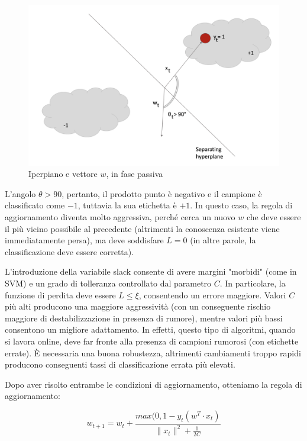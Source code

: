 \begin{figure}[h]
    \centering
    \includegraphics[scale=0.5]{Figure/PAII1.png}
    \caption{Iperpiano e vettore $w$, in fase passiva}
    \label{fig:PAII1}
\end{figure}
\FloatBarrier  

L'angolo $\theta> 90$, pertanto, il prodotto punto è negativo e il campione è classificato come $-1$, tuttavia la sua etichetta è $+1$. In questo caso, la regola di aggiornamento diventa molto aggressiva, perché cerca un nuovo $w$ che deve essere il più vicino possibile al precedente (altrimenti la conoscenza esistente viene immediatamente persa), ma deve soddisfare $L = 0$ (in altre parole, la classificazione deve essere corretta).

L'introduzione della variabile slack consente di avere margini "morbidi" (come in SVM) e un grado di tolleranza controllato dal parametro $C$. In particolare, la funzione di perdita deve essere $L \leq \xi$, consentendo un errore maggiore. Valori $C$ più alti producono una maggiore aggressività (con un conseguente rischio maggiore di destabilizzazione in presenza di rumore), mentre valori più bassi consentono un migliore adattamento. In effetti, questo tipo di algoritmi, quando si lavora online, deve far fronte alla presenza di campioni rumorosi (con etichette errate). È necessaria una buona robustezza, altrimenti cambiamenti troppo rapidi producono conseguenti tassi di classificazione errata più elevati.

Dopo aver risolto entrambe le condizioni di aggiornamento, otteniamo la regola di aggiornamento:

$$w_{t+1}=w_t+\frac{max(0,1-y_t(w^T\cdot x_t)}{\|x_t\|^2+\frac{1}{2C}}$$ 

